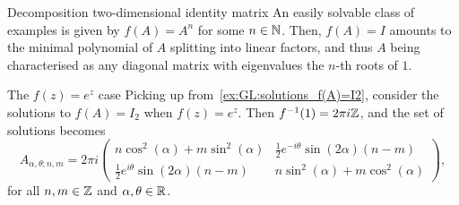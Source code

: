 \begin{examplebox}[label={ex:GL:solutions_f(A)=I2}]{Decomposition two-dimensional identity matrix}
An easily solvable class of examples is given by $f(A)=A^n$ for some $n\in{\mathbb{N}}$. Then, $f(A)=I$ amounts to the minimal polynomial of $A$ splitting into linear factors, and thus $A$ being characterised as any diagonal matrix with eigenvalues the $n$-th roots of $1$.
\end{examplebox}



\begin{examplebox}[label={ex:GL:solutions_e^A=I2}]{The $f(z)=e^z$ case}
Picking up from~\cref{ex:GL:solutions_f(A)=I2}, consider the solutions to $f(A)=I_2$ when $f(z)=e^z$.
Then $f^{-1}(1)=2\pi i{\mathbb{Z}}$, and the set of solutions becomes
\begin{equation}
    A_{\alpha,\theta;n,m} = 2\pi i
    \begin{pmatrix}
        n \cos^2(\alpha)+m\sin^2(\alpha) &
        \frac12 e^{-i\theta} \sin(2\alpha) (n-m) \\ 
        \frac12 e^{i\theta} \sin(2\alpha) (n-m) &
        n \sin^2(\alpha)+m\cos^2(\alpha)
    \end{pmatrix},
\end{equation}
for all $n,m\in{\mathbb{Z}}$ and $\alpha,\theta\in{\mathbb{R}}$.
\end{examplebox}

